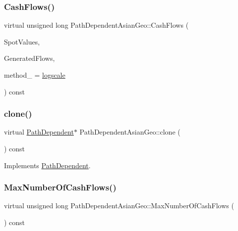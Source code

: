 \subsubsection{\texorpdfstring{Cash\+Flows()}{CashFlows()}}
{\footnotesize\ttfamily virtual unsigned long Path\+Dependent\+Asian\+Geo\+::\+Cash\+Flows (\begin{DoxyParamCaption}\item[{const \hyperlink{classMJArray}{M\+J\+Array} \&}]{Spot\+Values,  }\item[{std\+::vector$<$ \hyperlink{classMyCashFlow_1_1CashFlow}{My\+Cash\+Flow\+::\+Cash\+Flow} $>$ \&}]{Generated\+Flows,  }\item[{\hyperlink{PathDependent_8h_abed946c62f140eb7ff2ac742e6ad9497}{method}}]{method\+\_\+ = {\ttfamily \hyperlink{PathDependent_8h_abed946c62f140eb7ff2ac742e6ad9497a064d3d3358889658ce07fe9f3191d1fd}{logscale}} }\end{DoxyParamCaption}) const\hspace{0.3cm}{\ttfamily [virtual]}}

\hypertarget{classPathDependentAsianGeo_a2f180b3c727e6e8e8ed4e39f6a4ee839}{}\label{classPathDependentAsianGeo_a2f180b3c727e6e8e8ed4e39f6a4ee839} 
\subsubsection{\texorpdfstring{clone()}{clone()}}
{\footnotesize\ttfamily virtual \hyperlink{classPathDependent}{Path\+Dependent}$\ast$ Path\+Dependent\+Asian\+Geo\+::clone (\begin{DoxyParamCaption}{ }\end{DoxyParamCaption}) const\hspace{0.3cm}{\ttfamily [virtual]}}



Implements \hyperlink{classPathDependent_afcc10647f591175642c6dc0adba23f0b}{Path\+Dependent}.

\hypertarget{classPathDependentAsianGeo_a5c499689dd6591991d48883b3116ceb6}{}\label{classPathDependentAsianGeo_a5c499689dd6591991d48883b3116ceb6} 
\subsubsection{\texorpdfstring{Max\+Number\+Of\+Cash\+Flows()}{MaxNumberOfCashFlows()}}
{\footnotesize\ttfamily virtual unsigned long Path\+Dependent\+Asian\+Geo\+::\+Max\+Number\+Of\+Cash\+Flows (\begin{DoxyParamCaption}{ }\end{DoxyParamCaption}) const\hspace{0.3cm}{\ttfamily [virtual]}}




